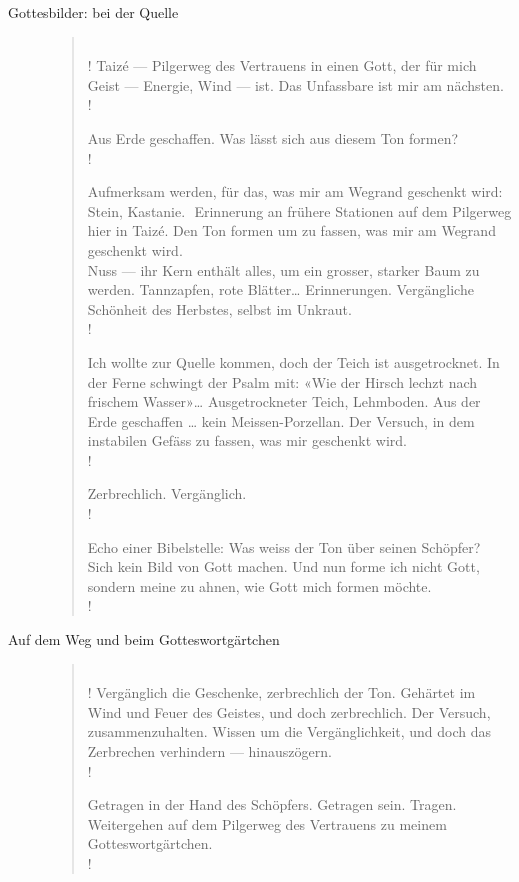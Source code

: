 \begin{impuls}
\begin{description}
 \item[Gottesbilder: bei der Quelle]
 \begin{gedicht}
 \begin{verse}
 \\!
 Taizé — Pilgerweg des Vertrauens in einen Gott,  der für mich Geist — Energie, Wind — ist. Das Unfassbare ist mir am nächsten.\\!
 
Aus Erde geschaffen. Was lässt sich aus diesem Ton formen?\\!

Aufmerksam werden, für das, was mir am Wegrand geschenkt wird: Stein, Kastanie.  Erinnerung an frühere Stationen auf dem Pilgerweg hier in Taizé. Den Ton formen um zu fassen, was mir am Wegrand geschenkt wird.\\
Nuss — ihr Kern enthält alles, um ein grosser, starker Baum zu werden. Tannzapfen, rote Blätter… Erinnerungen. Vergängliche Schönheit des Herbstes, selbst im Unkraut.\\!

Ich wollte zur Quelle kommen, doch der Teich ist ausgetrocknet. In der Ferne schwingt der Psalm mit: «Wie der Hirsch lechzt nach frischem Wasser»… Ausgetrockneter Teich, Lehmboden. Aus der Erde geschaffen … kein Meissen-Porzellan. Der Versuch, in dem instabilen Gefäss zu fassen, was mir geschenkt wird. \\!

Zerbrechlich. Vergänglich.\\!

Echo einer Bibelstelle: Was weiss der Ton über seinen Schöpfer?  Sich kein Bild von Gott machen. Und nun forme ich nicht Gott, sondern meine zu ahnen, wie Gott mich formen möchte.\\!
 \end{verse}
 \end{gedicht}
 \item[Auf dem Weg und beim Gotteswortgärtchen] 
 \begin{gedicht}
 \begin{verse}
 \\!
 Vergänglich die Geschenke, zerbrechlich der Ton. Gehärtet im Wind und Feuer des Geistes, und doch zerbrechlich. Der Versuch, zusammenzuhalten. Wissen um die Vergänglichkeit, und doch das Zerbrechen verhindern — hinauszögern.\\!
 
Getragen in der Hand des Schöpfers. Getragen sein. Tragen. Weitergehen auf dem Pilgerweg des Vertrauens zu meinem Gotteswortgärtchen.\\!


\end{verse}
\end{gedicht}
\end{description}
\end{impuls}
